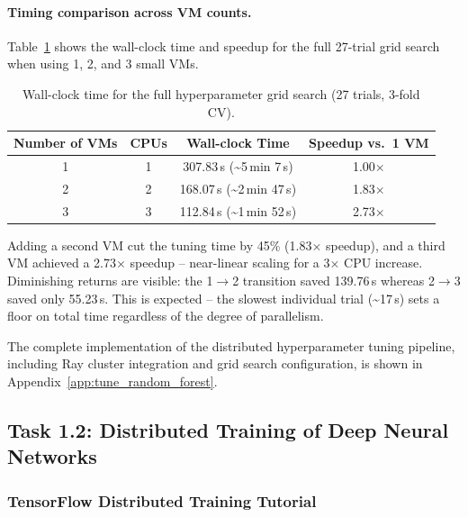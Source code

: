 \documentclass[11pt,a4paper]{article}
\begin{document}
\paragraph{Timing comparison across VM counts.}

Table~\ref{tab:timing} shows the wall-clock time and speedup for the full 27-trial
grid search when using 1, 2, and 3 small VMs.

\begin{table}[H]
  \centering
  \caption{Wall-clock time for the full hyperparameter grid search (27 trials, 3-fold CV).}
  \label{tab:timing}
  \begin{tabular}{cccc}
    \toprule
    Number of VMs & CPUs & Wall-clock Time & Speedup vs.\ 1 VM \\
    \midrule
    1 & 1 & 307.83\,s (\textasciitilde{}5\,min 7\,s)  & 1.00$\times$ \\
    2 & 2 & 168.07\,s (\textasciitilde{}2\,min 47\,s) & 1.83$\times$ \\
    3 & 3 & 112.84\,s (\textasciitilde{}1\,min 52\,s) & 2.73$\times$ \\
    \bottomrule
  \end{tabular}
\end{table}

Adding a second VM cut the tuning time by 45\% (1.83$\times$ speedup), and a
third VM achieved a 2.73$\times$ speedup -- near-linear scaling for a 3$\times$
CPU increase. Diminishing returns are visible: the 1$\rightarrow$2 transition
saved 139.76\,s whereas 2$\rightarrow$3 saved only 55.23\,s. This is expected --
the slowest individual trial (\textasciitilde{}17\,s) sets a floor on total time
regardless of the degree of parallelism.

The complete implementation of the distributed hyperparameter tuning pipeline,
including Ray cluster integration and grid search configuration, is shown in
Appendix~\ref{app:tune_random_forest}.

\subsection{Task 1.2: Distributed Training of Deep Neural Networks}

\subsubsection{TensorFlow Distributed Training Tutorial}
\end{document}
